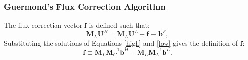 \subsubsection{Guermond's Flux Correction Algorithm}
The flux correction vector $\mathbf{f}$ is defined such that:
\begin{equation}\label{fc}
   \mathbf{M}_L\mathbf{U}^H = \mathbf{M}_L\mathbf{U}^L + \mathbf{f} \equiv \mathbf{b}^F,
\end{equation}
Substituting the solutions of Equations \ref{high} and \ref{low} gives the definition
of $\mathbf{f}$:
\begin{equation}\label{Fdef}
   \mathbf{f} \equiv \mathbf{M}_L\mathbf{M}_C^{-1}\mathbf{b}^H
      -\mathbf{M}_L\mathbf{M}_L^{-1}\mathbf{b}^L.
\end{equation}

